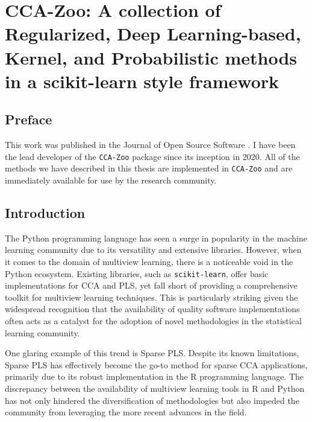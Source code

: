 \graphicspath{{chapters/software/}}


\chapter{CCA-Zoo: A collection of Regularized, Deep Learning-based, Kernel, and Probabilistic methods in a scikit-learn style framework}\label{ch:software}

\section*{Preface}

This work was published in the Journal of Open Source Software \citep{chapman2021cca}.
I have been the lead developer of the \texttt{CCA-Zoo} package since its inception in 2020.
All of the methods we have described in this thesis are implemented in \texttt{CCA-Zoo} and are immediately available for use by the research community.

\section{Introduction}

The Python programming language has seen a surge in popularity in the machine learning community due to its versatility and extensive libraries.
However, when it comes to the domain of multiview learning, there is a noticeable void in the Python ecosystem.
Existing libraries, such as \texttt{scikit-learn}\cite{pedregosa2011scikit}, offer basic implementations for CCA and PLS, yet fall short of providing a comprehensive toolkit for multiview learning techniques.
This is particularly striking given the widespread recognition that the availability of quality software implementations often acts as a catalyst for the adoption of novel methodologies in the statistical learning community.

One glaring example of this trend is Sparse PLS. Despite its known limitations, Sparse PLS has effectively become the go-to method for sparse CCA applications, primarily due to its robust implementation in the R programming language.
The discrepancy between the availability of multiview learning tools in R and Python has not only hindered the diversification of methodologies but also impeded the community from leveraging the more recent advances in the field.

